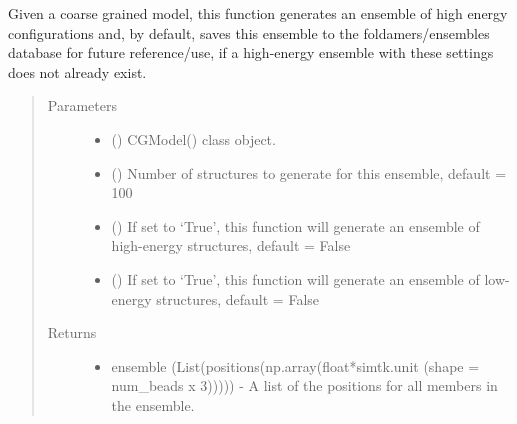\documentclass[letterpaper,12pt,english,openany,oneside]{sphinxmanual}
\begin{document}
\label{\detokenize{ensembles:module-ensembles.ens_build}}

\begin{fulllineitems}
\label{\detokenize{ensembles:ensembles.ens_build.get_ensemble}}
Given a coarse grained model, this function generates an ensemble of high energy configurations and, by default, saves this ensemble to the foldamers/ensembles database for future reference/use, if a high-energy ensemble with these settings does not already exist.
\begin{quote}\begin{description}
\item[{Parameters}] \leavevmode\begin{itemize}
\item {} 
 () \textendash{} CGModel() class object.

\item {} 
 () \textendash{} Number of structures to generate for this ensemble, default = 100

\item {} 
 () \textendash{} If set to ‘True’, this function will generate an ensemble of high-energy structures, default = False

\item {} 
 () \textendash{} If set to ‘True’, this function will generate an ensemble of low-energy structures, default = False

\end{itemize}

\item[{Returns}] \leavevmode
\begin{itemize}
\item {} 
ensemble (List(positions(np.array(float*simtk.unit (shape = num\_beads x 3))))) - A list of the positions for all members in the ensemble.

\end{itemize}


\end{description}\end{quote}

\end{fulllineitems}
\end{document}
